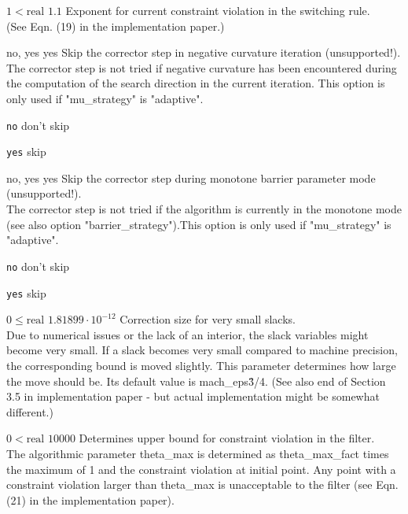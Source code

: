 %
{$1<\textrm{real}$}%
{$1.1$}%
{Exponent for current constraint violation in the switching rule.\\
(See Eqn. (19) in the implementation paper.)}%
{}

%
{\ttfamily no, yes}%
{yes}%
{Skip the corrector step in negative curvature iteration (unsupported!).\\
The corrector step is not tried if negative curvature has been encountered during the computation of the search direction in the current iteration. This option is only used if "mu\_strategy" is "adaptive".}%
{\begin{list}{}{
\setlength{\parsep}{0em}
\setlength{\leftmargin}{5ex}
\setlength{\labelwidth}{2ex}
\setlength{\itemindent}{0ex}
\setlength{\topsep}{0pt}}
\item[\texttt{no}] don't skip
\item[\texttt{yes}] skip
\end{list}
}

%
{\ttfamily no, yes}%
{yes}%
{Skip the corrector step during monotone barrier parameter mode (unsupported!).\\
The corrector step is not tried if the algorithm is currently in the monotone mode (see also option "barrier\_strategy").This option is only used if "mu\_strategy" is "adaptive".}%
{\begin{list}{}{
\setlength{\parsep}{0em}
\setlength{\leftmargin}{5ex}
\setlength{\labelwidth}{2ex}
\setlength{\itemindent}{0ex}
\setlength{\topsep}{0pt}}
\item[\texttt{no}] don't skip
\item[\texttt{yes}] skip
\end{list}
}

%
{$0\leq\textrm{real}$}%
{$1.81899 \cdot 10^{-12}$}%
{Correction size for very small slacks.\\
Due to numerical issues or the lack of an interior, the slack variables might become very small.  If a slack becomes very small compared to machine precision, the corresponding bound is moved slightly.  This parameter determines how large the move should be.  Its default value is mach\_eps\^{3/4}.  (See also end of Section 3.5 in implementation paper - but actual implementation might be somewhat different.)}%
{}

%
{$0<\textrm{real}$}%
{$10000$}%
{Determines upper bound for constraint violation in the filter.\\
The algorithmic parameter theta\_max is determined as theta\_max\_fact times the maximum of 1 and the constraint violation at initial point.  Any point with a constraint violation larger than theta\_max is unacceptable to the filter (see Eqn. (21) in the implementation paper).}%
{}

